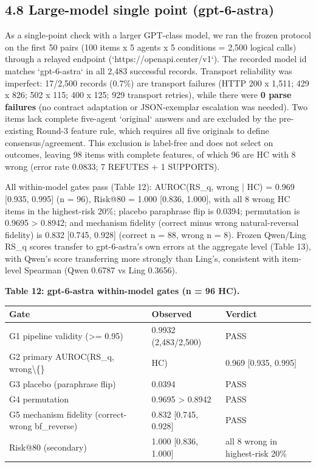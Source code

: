 \documentclass[11pt]{article}
\begin{document}
\subsection{4.8 Large-model single point (gpt-6-astra)}

As a single-point check with a larger GPT-class model, we ran the frozen protocol on the first 50 pairs (100 items x 5 agents x 5 conditions = 2,500 logical calls) through a relayed endpoint (`https://openapi.center/v1`). The recorded model id matches `gpt-6-astra` in all 2,483 successful records. Transport reliability was imperfect: 17/2,500 records (0.7\%) are transport failures (HTTP 200 x 1,511; 429 x 826; 502 x 115; 400 x 125; 929 transport retries), while there were \textbf{0 parse failures} (no contract adaptation or JSON-exemplar escalation was needed). Two items lack complete five-agent `original` answers and are excluded by the pre-existing Round-3 feature rule, which requires all five originals to define consensus/agreement. This exclusion is label-free and does not select on outcomes, leaving 98 items with complete features, of which 96 are HC with 8 wrong (error rate 0.0833; 7 REFUTES + 1 SUPPORTS).

All within-model gates pass (Table 12): AUROC(RS\_q, wrong | HC) = 0.969 [0.935, 0.995] (n = 96), Risk@80 = 1.000 [0.836, 1.000], with all 8 wrong HC items in the highest-risk 20\%; placebo paraphrase flip is 0.0394; permutation is 0.9695 > 0.8942; and mechanism fidelity (correct minus wrong natural-reversal fidelity) is 0.832 [0.745, 0.928] (correct n = 88, wrong n = 8). Frozen Qwen/Ling RS\_q scores transfer to gpt-6-astra's own errors at the aggregate level (Table 13), with Qwen's score transferring more strongly than Ling's, consistent with item-level Spearman (Qwen 0.6787 vs Ling 0.3656).

\textbf{Table 12: gpt-6-astra within-model gates (n = 96 HC).}

\begin{table}[t]
\centering
\small
\begin{tabular}{lll}
\toprule
Gate & Observed & Verdict \\
\midrule
G1 pipeline validity (>= 0.95) & 0.9932 (2,483/2,500) & PASS \\
G2 primary AUROC(RS\_q, wrong\textbackslash\{\} & HC) & 0.969 [0.935, 0.995] \\
G3 placebo (paraphrase flip) & 0.0394 & PASS \\
G4 permutation & 0.9695 > 0.8942 & PASS \\
G5 mechanism fidelity (correct-wrong bf\_reverse) & 0.832 [0.745, 0.928] & PASS \\
Risk@80 (secondary) & 1.000 [0.836, 1.000] & all 8 wrong in highest-risk 20\% \\
\bottomrule
\end{tabular}
\end{table}
\end{document}
